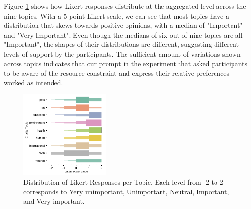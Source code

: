 
Figure \ref{fig:likert_exp1} shows how Likert responses distribute at the aggregated level across the nine topics. With a 5-point Likert scale, we can see that most topics have a distribution that skews towards positive opinions, with a median of "Important" and "Very Important". Even though the medians of six out of nine topics are all "Important", the shapes of their distributions are different, suggesting different levels of support by the participants. The sufficient amount of variations shown across topics indicates that our prompt in the experiment that asked participants to be aware of the resource constraint and express their relative preferences worked as intended. 

\begin{figure}[htpb]
    \centering
    \includegraphics[width=0.4\textwidth, keepaspectratio=true]{content/image/likert_distribution_per_topic.pdf}
    \caption{
      Distribution of Likert Responses per Topic. Each level from -2 to 2 corresponds to Very unimportant, Unimportant, Neutral, Important, and Very important.
    }
    \label{fig:likert_exp1}
\end{figure}

